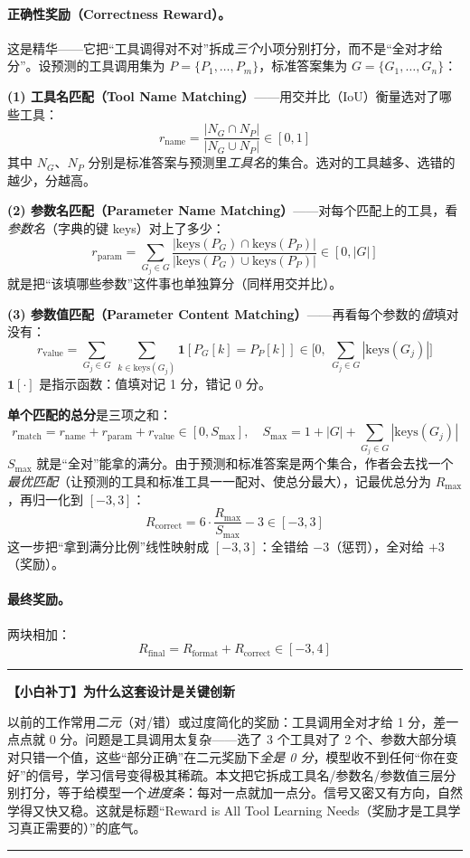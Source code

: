 \documentclass[11pt,UTF8,fontset=fandol]{ctexart}
\newenvironment{tip}[1]{%
  \par\smallskip\noindent\rule{\linewidth}{0.4pt}\par\nobreak
  \noindent\textbf{【小白补丁】#1}\par\nobreak\noindent\ignorespaces
}{%
  \par\noindent\rule{\linewidth}{0.4pt}\par\smallskip
}
\begin{document}
\paragraph{正确性奖励（Correctness Reward）。}这是精华——它把“工具调得对不对”拆成\emph{三个}小项分别打分，而不是“全对才给分”。设预测的工具调用集为 $P=\{P_1,\dots,P_m\}$，标准答案集为 $G=\{G_1,\dots,G_n\}$：

\textbf{(1) 工具名匹配（Tool Name Matching）}——用交并比（IoU）衡量选对了哪些工具：
\[
r_{\text{name}}=\frac{|N_G \cap N_P|}{|N_G \cup N_P|}\in[0,1]
\]
其中 $N_G$、$N_P$ 分别是标准答案与预测里\emph{工具名}的集合。选对的工具越多、选错的越少，分越高。

\textbf{(2) 参数名匹配（Parameter Name Matching）}——对每个匹配上的工具，看\emph{参数名}（字典的键 keys）对上了多少：
\[
r_{\text{param}}=\sum_{G_j\in G}\frac{|\text{keys}(P_G)\cap \text{keys}(P_P)|}{|\text{keys}(P_G)\cup \text{keys}(P_P)|}\in[0,|G|]
\]
就是把“该填哪些参数”这件事也单独算分（同样用交并比）。

\textbf{(3) 参数值匹配（Parameter Content Matching）}——再看每个参数的\emph{值}填对没有：
\[
r_{\text{value}}=\sum_{G_j\in G}\ \sum_{k\in \text{keys}(G_j)}\mathbf{1}[P_G[k]=P_P[k]]\in\Big[0,\ \textstyle\sum_{G_j\in G}|\text{keys}(G_j)|\Big]
\]
$\mathbf{1}[\cdot]$ 是指示函数：值填对记 1 分，错记 0 分。

\textbf{单个匹配的总分}是三项之和：
\[
r_{\text{match}}=r_{\text{name}}+r_{\text{param}}+r_{\text{value}}\in[0,S_{\max}],\quad S_{\max}=1+|G|+\sum_{G_j\in G}|\text{keys}(G_j)|
\]
$S_{\max}$ 就是“全对”能拿的满分。由于预测和标准答案是两个集合，作者会去找一个\emph{最优匹配}（让预测的工具和标准工具一一配对、使总分最大），记最优总分为 $R_{\max}$，再归一化到 $[-3,3]$：
\[
R_{\text{correct}}=6\cdot\frac{R_{\max}}{S_{\max}}-3\in[-3,3]
\]
这一步把“拿到满分比例”线性映射成 $[-3,3]$：全错给 $-3$（惩罚），全对给 $+3$（奖励）。

\paragraph{最终奖励。}两块相加：
\[
R_{\text{final}}=R_{\text{format}}+R_{\text{correct}}\in[-3,4]
\]

\begin{tip}{为什么这套设计是关键创新}
以前的工作常用\emph{二元}（对/错）或过度简化的奖励：工具调用全对才给 1 分，差一点点就 0 分。问题是工具调用太复杂——选了 3 个工具对了 2 个、参数大部分填对只错一个值，这些“部分正确”在二元奖励下\emph{全是 0 分}，模型收不到任何“你在变好”的信号，学习信号变得极其稀疏。本文把它拆成工具名/参数名/参数值三层分别打分，等于给模型一个\emph{进度条}：每对一点就加一点分。信号又密又有方向，自然学得又快又稳。这就是标题“Reward is All Tool Learning Needs（奖励才是工具学习真正需要的）”的底气。
\end{tip}
\end{document}
